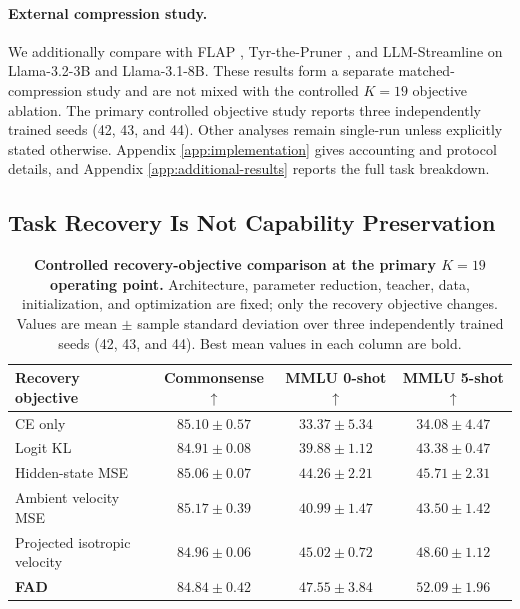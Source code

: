 \documentclass{article}
\theoremstyle{plain}
\theoremstyle{definition}
\theoremstyle{remark}
\begin{document}
\paragraph{External compression study.}
We additionally compare with FLAP \citep{flap}, Tyr-the-Pruner
\citep{Li2025TyrThePruner}, and LLM-Streamline \citep{chen2025streamlining} on
Llama-3.2-3B and Llama-3.1-8B.  These results form a separate matched-compression
study and are not mixed with the controlled $K=19$ objective ablation.  The primary controlled objective study reports three independently trained seeds (42, 43, and 44). Other analyses remain single-run unless explicitly stated otherwise. Appendix
\ref{app:implementation} gives accounting and protocol details, and Appendix
\ref{app:additional-results} reports the full task breakdown.

\subsection{Task Recovery Is Not Capability Preservation}
\label{sec:objective-results}

\begin{table}[H]
\caption{\textbf{Controlled recovery-objective comparison at the primary
$K=19$ operating point.} Architecture, parameter reduction, teacher, data,
initialization, and optimization are fixed; only the recovery objective changes.
Values are mean $\pm$ sample standard deviation over three independently trained
seeds (42, 43, and 44). Best mean values in each column are bold.}
\label{tab:objective-main}
\centering
\small
\setlength{\tabcolsep}{7pt}
\renewcommand{\arraystretch}{1.05}
\begin{tabular}{@{}lccc@{}}
\toprule
\textbf{Recovery objective} & \textbf{Commonsense $\uparrow$}
& \textbf{MMLU 0-shot $\uparrow$} & \textbf{MMLU 5-shot $\uparrow$}\\
\midrule
CE only
& $85.10 \pm 0.57$
& $33.37 \pm 5.34$
& $34.08 \pm 4.47$\\
Logit KL
& $84.91 \pm 0.08$
& $39.88 \pm 1.12$
& $43.38 \pm 0.47$\\
Hidden-state MSE
& $85.06 \pm 0.07$
& $44.26 \pm 2.21$
& $45.71 \pm 2.31$\\
Ambient velocity MSE
& $\mathbf{85.17 \pm 0.39}$
& $40.99 \pm 1.47$
& $43.50 \pm 1.42$\\
Projected isotropic velocity
& $84.96 \pm 0.06$
& $45.02 \pm 0.72$
& $48.60 \pm 1.12$\\
\textbf{FAD}
& $84.84 \pm 0.42$
& $\mathbf{47.55 \pm 3.84}$
& $\mathbf{52.09 \pm 1.96}$\\
\bottomrule
\end{tabular}
\end{table}
\end{document}

